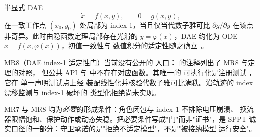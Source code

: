 \begin{definition}\label{def:sp-th-dae}
半显式 DAE
\begin{equation}
\dot x=f(x,y),\qquad 0=g(x,y),
\end{equation}
在一致工作点 $(x_0,y_0)$ 处局部为 index-1，当且仅当代数子雅可比
$\partial g/\partial y$ 在该点非奇异。此时由隐函数定理局部存在光滑的
$y=\varphi(x)$，DAE 约化为 ODE $\dot x=f(x,\varphi(x))$，初值一致性与
数值积分的适定性随之确立~\cite{spth:brenan96}。
\end{definition}

\begin{gapnote}
MR8（DAE index-1 适定性门）当前没有公开的  入口：
 的注释列出了 MR8 与定理的对照，
但公共 API 与  中不存在对应函数。其唯一的
可执行化是注册测试 ，它在
单一声明测试点上经
装配线性化并核验代数子雅可比满秩。沿轨迹的 index 漂移监测与 index-1 破坏的
类型化拒绝尚未实现。
\end{gapnote}

\begin{remark}[必要条件与充分条件的分界]
MR7 与 MR8 均为\emph{必要}的形成条件：角色闭包与 index-1 不排除电压崩溃、
换流器限幅饱和、保护动作或动态失稳。把必要条件写成"门"而非"证书"，是
SPPT 诚实口径的一部分：守卫承诺的是"拒绝不适定模型"，不是"被接纳模型
运行安全"。
\end{remark}

